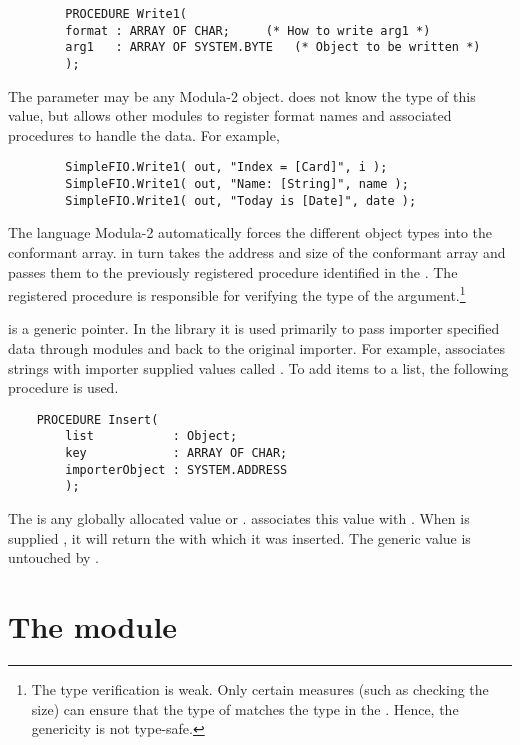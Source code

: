 \begin{verbatim}
        PROCEDURE Write1(
        format : ARRAY OF CHAR;     (* How to write arg1 *)
        arg1   : ARRAY OF SYSTEM.BYTE   (* Object to be written *)
        );
\end{verbatim}

The  parameter may be any Modula-2 object.
 does not know the type of this value, but allows
other modules to register format names and associated procedures
to handle the data.  For example,

\begin{verbatim}
        SimpleFIO.Write1( out, "Index = [Card]", i ); 
        SimpleFIO.Write1( out, "Name: [String]", name );
        SimpleFIO.Write1( out, "Today is [Date]", date );
\end{verbatim}

The language Modula-2 automatically forces the different object types
into the conformant array.   in turn takes the address
and size of the conformant array and passes them to the previously
registered procedure identified in the .  The registered
procedure is responsible for verifying the type of the 
argument.\footnote{
    The type verification is weak. Only certain measures (such
    as checking the size) can ensure that the type of  matches
    the type in the .  Hence, the genericity is not type-safe.
}

 is a generic pointer.  In the library it is
used primarily
to pass importer specified data through modules and back to the original
importer.  For example,  associates strings with importer
supplied values called .  To add items to a list,
the following procedure is used.

\begin{verbatim}
    PROCEDURE Insert(
        list           : Object;
        key            : ARRAY OF CHAR;
        importerObject : SYSTEM.ADDRESS
        );
\end{verbatim}

The  is any globally allocated value or 
.
 associates this value with .  When
 is supplied , it will return
the  with which it was inserted.  The generic
value is untouched by .

\section{The module } 

